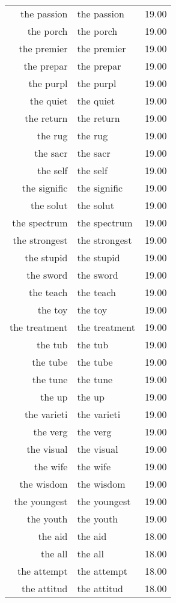 \begin{table}[ht]
\begin{tabular}{rlr}
  the passion & the passion & 19.00 \\ 
  the porch & the porch & 19.00 \\ 
  the premier & the premier & 19.00 \\ 
  the prepar & the prepar & 19.00 \\ 
  the purpl & the purpl & 19.00 \\ 
  the quiet & the quiet & 19.00 \\ 
  the return & the return & 19.00 \\ 
  the rug & the rug & 19.00 \\ 
  the sacr & the sacr & 19.00 \\ 
  the self & the self & 19.00 \\ 
  the signific & the signific & 19.00 \\ 
  the solut & the solut & 19.00 \\ 
  the spectrum & the spectrum & 19.00 \\ 
  the strongest & the strongest & 19.00 \\ 
  the stupid & the stupid & 19.00 \\ 
  the sword & the sword & 19.00 \\ 
  the teach & the teach & 19.00 \\ 
  the toy & the toy & 19.00 \\ 
  the treatment & the treatment & 19.00 \\ 
  the tub & the tub & 19.00 \\ 
  the tube & the tube & 19.00 \\ 
  the tune & the tune & 19.00 \\ 
  the up & the up & 19.00 \\ 
  the varieti & the varieti & 19.00 \\ 
  the verg & the verg & 19.00 \\ 
  the visual & the visual & 19.00 \\ 
  the wife & the wife & 19.00 \\ 
  the wisdom & the wisdom & 19.00 \\ 
  the youngest & the youngest & 19.00 \\ 
  the youth & the youth & 19.00 \\ 
  the aid & the aid & 18.00 \\ 
  the all & the all & 18.00 \\ 
  the attempt & the attempt & 18.00 \\ 
  the attitud & the attitud & 18.00 \\ 

\end{tabular}
\end{table}
